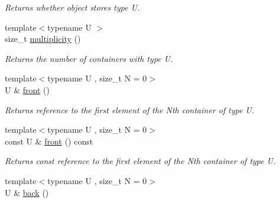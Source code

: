 \begin{DoxyCompactItemize}
\begin{DoxyCompactList}\small\item\em Returns whether object stores type U. \end{DoxyCompactList}\item 
\hypertarget{classheterogeneous_1_1heterolist_3_01_t_00_01_types_8_8_8_4_a05fea46204817b46934e7a9432ff863e}{}{\footnotesize template$<$typename U $>$ }\\size\+\_\+t \hyperlink{classheterogeneous_1_1heterolist_3_01_t_00_01_types_8_8_8_4_a05fea46204817b46934e7a9432ff863e}{multiplicity} ()\label{classheterogeneous_1_1heterolist_3_01_t_00_01_types_8_8_8_4_a05fea46204817b46934e7a9432ff863e}

\begin{DoxyCompactList}\small\item\em Returns the number of containers with type U. \end{DoxyCompactList}\item 
\hypertarget{classheterogeneous_1_1heterolist_3_01_t_00_01_types_8_8_8_4_a22b7d80da0e24e7007357542e1952752}{}{\footnotesize template$<$typename U , size\+\_\+t N = 0$>$ }\\U \& \hyperlink{classheterogeneous_1_1heterolist_3_01_t_00_01_types_8_8_8_4_a22b7d80da0e24e7007357542e1952752}{front} ()\label{classheterogeneous_1_1heterolist_3_01_t_00_01_types_8_8_8_4_a22b7d80da0e24e7007357542e1952752}

\begin{DoxyCompactList}\small\item\em Returns reference to the first element of the Nth container of type U. \end{DoxyCompactList}\item 
\hypertarget{classheterogeneous_1_1heterolist_3_01_t_00_01_types_8_8_8_4_a2d180fb67748c0c0a80009fac3679bd5}{}{\footnotesize template$<$typename U , size\+\_\+t N = 0$>$ }\\const U \& \hyperlink{classheterogeneous_1_1heterolist_3_01_t_00_01_types_8_8_8_4_a2d180fb67748c0c0a80009fac3679bd5}{front} () const \label{classheterogeneous_1_1heterolist_3_01_t_00_01_types_8_8_8_4_a2d180fb67748c0c0a80009fac3679bd5}

\begin{DoxyCompactList}\small\item\em Returns const reference to the first element of the Nth container of type U. \end{DoxyCompactList}\item 
\hypertarget{classheterogeneous_1_1heterolist_3_01_t_00_01_types_8_8_8_4_a0377da3af6db84bec0e57449f812c000}{}{\footnotesize template$<$typename U , size\+\_\+t N = 0$>$ }\\U \& \hyperlink{classheterogeneous_1_1heterolist_3_01_t_00_01_types_8_8_8_4_a0377da3af6db84bec0e57449f812c000}{back} ()\label{classheterogeneous_1_1heterolist_3_01_t_00_01_types_8_8_8_4_a0377da3af6db84bec0e57449f812c000}


\end{DoxyCompactItemize}
